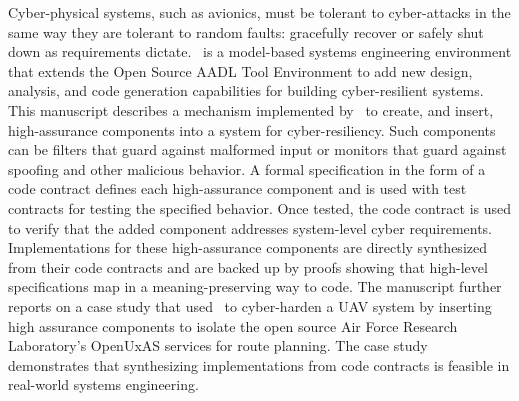 Cyber-physical systems, such as avionics, must be tolerant to
cyber-attacks in the same way they are tolerant to random faults: gracefully recover or safely shut down as requirements dictate.
\brfcs\ is a model-based systems engineering environment that extends the Open Source AADL Tool Environment to add new design, analysis, and code generation capabilities for building cyber-resilient systems.
This manuscript describes a mechanism implemented by \brfcs\ to create, and insert, high-assurance components into a system for cyber-resiliency.
Such components can be filters that guard against malformed input or monitors that guard against spoofing and other malicious behavior.
A formal specification in the form of a code contract defines each high-assurance component and is used with test contracts for testing the specified behavior.
Once tested, the code contract is used to verify that the added component addresses system-level cyber requirements.
Implementations for these
high-assurance components are directly synthesized from their code
contracts and are backed up by proofs showing that high-level
specifications map in a meaning-preserving way to code.
The manuscript further reports on a case study that used \brfcs\ to cyber-harden a UAV system by inserting high assurance components to isolate the open source Air Force Research Laboratory's OpenUxAS services for
route planning.  The case study
demonstrates that synthesizing implementations from code contracts is feasible in real-world systems
engineering.
